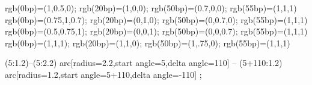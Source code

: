 %
                        {rgb(0bp)=(1,0.5,0);
                          rgb(20bp)=(1,0,0);
                          rgb(50bp)=(0.7,0,0);
                          rgb(55bp)=(1,1,1)}
%
                        {rgb(0bp)=(0.75,1,0.7);
                          rgb(20bp)=(0,1,0);
                          rgb(50bp)=(0,0.7,0);
                          rgb(55bp)=(1,1,1)}
%
                        {rgb(0bp)=(0.5,0.75,1);
                          rgb(20bp)=(0,0,1);
                          rgb(50bp)=(0,0,0.7);
                          rgb(55bp)=(1,1,1)}
%
                        {rgb(0bp)=(1,1,1);
                          rgb(20bp)=(1,1,0);
                          rgb(50bp)=(1,.75,0);
                          rgb(55bp)=(1,1,1)}


\begin{tikzfadingfrompicture}[name=fade out 2]
\shade[shading=radial,rotate=30,
  inner  color=transparent!0,
  outer color=transparent!100] %
           (5:1.2)--(5:2.2) 
           arc[radius=2.2,start angle=5,delta angle=110] 
           -- (5+110:1.2)
           arc[radius=1.2,start angle=5+110,delta angle=-110] ;
\end{tikzfadingfrompicture}

